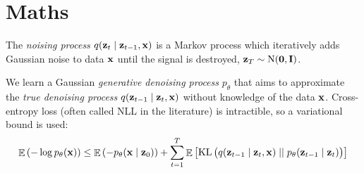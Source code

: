 \documentclass{report}
\theoremstyle{definition}
\theoremstyle{plain}
\theoremstyle{definition}
\theoremstyle{remark}
\numberwithin{equation}{section}
\numberwithin{figure}{section}
\numberwithin{table}{section}
\begin{document}
\setcounter{secnumdepth}{3}

\section{Maths}
The \textit{noising process} \(q(\vb{z}_{t} \mid \vb{z}_{t-1}, \vb{x})\) is a Markov process which iteratively adds Gaussian noise to data \(\vb{x}\) until the signal is destroyed, \(\vb{z}_{T} \sim \operatorname{N}(\vb{0}, \mathbf{I})\).

We learn a Gaussian \textit{generative denoising process} \(p_{\theta}\) that aims to approximate the \textit{true denoising process} \(q(\vb{z}_{t-1} \mid \vb{z}_{t}, \vb{x})\) without knowledge of the data \(\vb{x}\). Cross-entropy loss (often called NLL in the literature) is intractible, so a variational bound is used:
\[
  \mathop{\mathbb{E}}\qty(-\log p_{\theta}(\vb{x})) \leq \mathop{\mathbb{E}}\qty(- p_{\theta}(\vb{x} \mid \vb{z}_{0})) + \sum_{t=1}^{T} \mathop{\mathbb{E}}\qty[\operatorname{KL}\big( q(\vb{z}_{t-1} \mid \vb{z}_{t}, \vb{x}) \mid \mid p_{\theta}(\vb{z}_{t-1} \mid \vb{z}_{t})\big)]
\]
\end{document}
